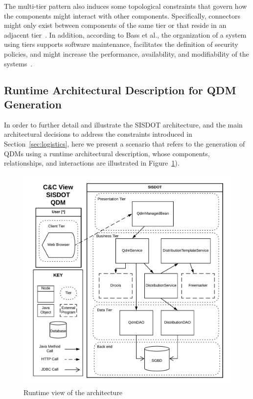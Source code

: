 \documentclass[twocolumn]{bmcart}%
\begin{document}
The multi-tier pattern also induces some topological constraints that govern how the components might interact with other components. Specifically, connectors might only exist between components of the same tier or that reside in an adjacent tier~\cite{clements2011documenting}. In addition, according to Bass et al., the organization of a system using tiers supports software maintenance, facilitates the definition of security policies, and might increase the performance, availability, and modifiability of the systems~\cite{bass2013software}. 



\subsection{Runtime Architectural Description for QDM Generation}

In order to further detail and illustrate the SISDOT architecture, and the main architectural decisions to address the constraints introduced in Section~\ref{sec:logistics}, here we present a scenario that refers to the generation of QDMs using a runtime architectural description, whose components, relationships, and interactions are illustrated in Figure~\ref{fig:runtime_qdm}). 

\begin{figure}[!ht] %
    \hspace*{-0.55cm}
	\includegraphics[scale=0.54]{img/runtimeView_qdm.png}
	\caption{Runtime view of the architecture} 
	\label{fig:runtime_qdm}
\end{figure}
\end{document}
